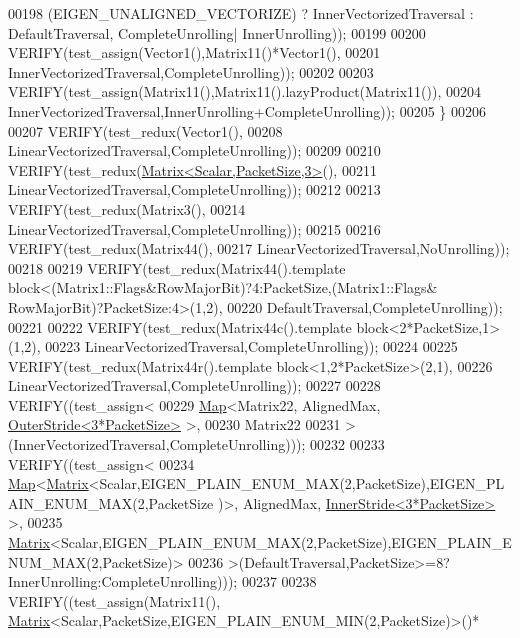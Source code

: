 \begin{DoxyCode}
00198         (EIGEN\_UNALIGNED\_VECTORIZE) ? InnerVectorizedTraversal : DefaultTraversal, CompleteUnrolling|
      InnerUnrolling));
00199 
00200       VERIFY(test\_assign(Vector1(),Matrix11()*Vector1(),
00201                          InnerVectorizedTraversal,CompleteUnrolling));
00202 
00203       VERIFY(test\_assign(Matrix11(),Matrix11().lazyProduct(Matrix11()),
00204                          InnerVectorizedTraversal,InnerUnrolling+CompleteUnrolling));
00205     \}
00206 
00207     VERIFY(test\_redux(Vector1(),
00208       LinearVectorizedTraversal,CompleteUnrolling));
00209 
00210     VERIFY(test\_redux(\hyperlink{group___core___module_class_eigen_1_1_matrix}{Matrix<Scalar,PacketSize,3>}(),
00211       LinearVectorizedTraversal,CompleteUnrolling));
00212 
00213     VERIFY(test\_redux(Matrix3(),
00214       LinearVectorizedTraversal,CompleteUnrolling));
00215 
00216     VERIFY(test\_redux(Matrix44(),
00217       LinearVectorizedTraversal,NoUnrolling));
00218 
00219     VERIFY(test\_redux(Matrix44().\textcolor{keyword}{template} block<(Matrix1::Flags&RowMajorBit)?4:PacketSize,(Matrix1::Flags&
      RowMajorBit)?PacketSize:4>(1,2),
00220       DefaultTraversal,CompleteUnrolling));
00221 
00222     VERIFY(test\_redux(Matrix44c().\textcolor{keyword}{template} block<2*PacketSize,1>(1,2),
00223       LinearVectorizedTraversal,CompleteUnrolling));
00224 
00225     VERIFY(test\_redux(Matrix44r().\textcolor{keyword}{template} block<1,2*PacketSize>(2,1),
00226       LinearVectorizedTraversal,CompleteUnrolling));
00227 
00228     VERIFY((test\_assign<
00229             \hyperlink{group___core___module_class_eigen_1_1_map}{Map}<Matrix22, AlignedMax, \hyperlink{class_eigen_1_1_outer_stride}{OuterStride<3*PacketSize>} >,
00230             Matrix22
00231             >(InnerVectorizedTraversal,CompleteUnrolling)));
00232 
00233     VERIFY((test\_assign<
00234             \hyperlink{group___core___module_class_eigen_1_1_map}{Map}<\hyperlink{group___core___module_class_eigen_1_1_matrix}{Matrix}<Scalar,EIGEN\_PLAIN\_ENUM\_MAX(2,PacketSize),EIGEN\_PLAIN\_ENUM\_MAX(2,PacketSize
      )>, AlignedMax, \hyperlink{class_eigen_1_1_inner_stride}{InnerStride<3*PacketSize>} >,
00235             \hyperlink{group___core___module_class_eigen_1_1_matrix}{Matrix}<Scalar,EIGEN\_PLAIN\_ENUM\_MAX(2,PacketSize),EIGEN\_PLAIN\_ENUM\_MAX(2,PacketSize)>
00236             >(DefaultTraversal,PacketSize>=8?InnerUnrolling:CompleteUnrolling)));
00237 
00238     VERIFY((test\_assign(Matrix11(), \hyperlink{group___core___module_class_eigen_1_1_matrix}{Matrix}<Scalar,PacketSize,EIGEN\_PLAIN\_ENUM\_MIN(2,PacketSize)>()*

\end{DoxyCode}
